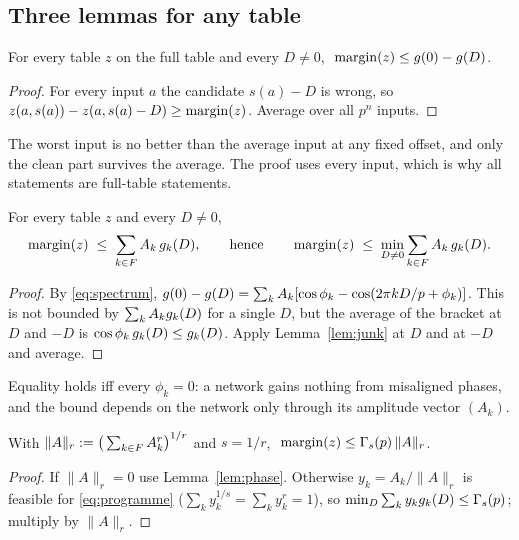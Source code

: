 \subsection{Three lemmas for any table}
\label{sec:lemmas}

\begin{lemma}
\label{lem:junk}
For every table $z$ on the full table and every $D\neq 0$,
$\ \operatorname{margin}(z)\le g(0)-g(D)$.
\end{lemma}
\begin{proof}
For every input $a$ the candidate $s(a)-D$ is wrong, so $z(a,s(a))-z(a,s(a)-D)\ge\operatorname{margin}(z)$. Average
over all $p^n$ inputs.
\end{proof}
The worst input is no better than the average input at any fixed offset, and only the clean part
survives the average. The proof uses every input, which is why all statements are full-table
statements.

\begin{lemma}
\label{lem:phase}
For every table $z$ and every $D\neq 0$,
\begin{equation}
  \operatorname{margin}(z)\;\le\;\sum_{k\in F} A_k\,g_{k}(D),
  \qquad\text{hence}\qquad
  \operatorname{margin}(z)\;\le\;\min_{D\neq 0}\sum_{k\in F} A_k\,g_{k}(D).
\end{equation}
\end{lemma}
\begin{proof}
By \eqref{eq:spectrum}, $g(0)-g(D)=\sum_k A_k[\cos\phi_k-\cos(2\pi kD/p+\phi_k)]$. This is not
bounded by $\sum_k A_kg_{k}(D)$ for a single $D$, but the average of the bracket at $D$ and $-D$ is
$\cos\phi_k\,g_{k}(D)\le g_{k}(D)$. Apply Lemma~\ref{lem:junk} at $D$ and at $-D$ and average.
\end{proof}
Equality holds iff every $\phi_k=0$: a network gains nothing from misaligned phases, and the
bound depends on the network only through its amplitude vector $(A_k)$.

\begin{proposition}
\label{prop:coverage}
With $\|A\|_r:=\big(\sum_{k\in F}A_k^r\big)^{1/r}$ and $s=1/r$,
$\ \operatorname{margin}(z)\le\Gamma_s(p)\,\|A\|_r$.
\end{proposition}
\begin{proof}
If $\|A\|_r=0$ use Lemma~\ref{lem:phase}. Otherwise $y_k=A_k/\|A\|_r$ is feasible for
\eqref{eq:programme} ($\sum_k y_k^{1/s}=\sum_k y_k^{r}=1$), so $\min_D\sum_k y_kg_{k}(D)\le\Gamma_s(p)$;
multiply by $\|A\|_r$.
\end{proof}

